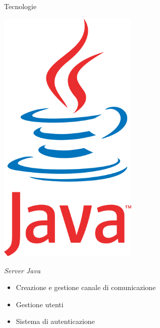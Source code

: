 	\subsection{}
		\begin{frame}{Tecnologie}
			\begin{center}
				\begin{minipage}{\textwidth}
					\begin{minipage}{0.29\textwidth}
						\includegraphics[width=0.5\textwidth]{capitolo_2/immagini/java.png}
					\end{minipage}
					\begin{minipage}{0.60\textwidth}
						\begin{block}{\emph{Server Java}}
							\begin{itemize}
								\item Creazione e gestione canale di comunicazione
								\item Gestione utenti
								\item Sistema di autenticazione
							\end{itemize}
						\end{block}
					\end{minipage}
				\end{minipage}
				\vspace{2mm}
				\begin{minipage}{\textwidth}
					\begin{minipage}{0.60\textwidth}

\end{minipage}
\end{minipage}
\end{center}
\end{frame}
